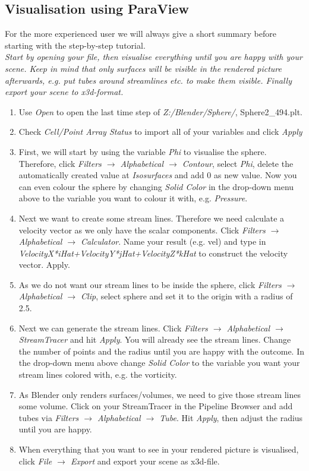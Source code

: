 \documentclass[11pt,twoside,a4paper]{fdyartcl}
\theoremstyle{myPlain}
\theoremstyle{myDefinition}
\begin{document}
\subsection{Visualisation using ParaView}
For the more experienced user we will always give a short summary before starting with the step-by-step tutorial.\\
\textit{Start by opening your file, then visualise everything until you are happy with your scene. Keep in mind that only surfaces will be visible in the rendered picture afterwards, e.g. put tubes around streamlines etc. to make them visible. Finally export your scene to x3d-format.}
\begin{enumerate}
	\item Use \textit{Open} to open the last time step of \textit{Z:/Blender/Sphere/}, Sphere2\_494.plt.
	\item Check \textit{Cell/Point Array Status} to import all of your variables and click \textit{Apply}
	\item First, we will start by using the variable \textit{Phi} to visualise the sphere. Therefore, click \textit{Filters $\rightarrow$ Alphabetical $\rightarrow$ Contour}, select \textit{Phi}, delete the automatically created value at \textit{Isosurfaces} and add 0 as new value. Now you can even colour the sphere by changing \textit{Solid Color} in the drop-down menu above to the variable you want to colour it with, e.g. \textit{Pressure}. 
	\item Next we want to create some stream lines. Therefore we need calculate a velocity vector as we only have the scalar components. Click \textit{Filters $\rightarrow$ Alphabetical $\rightarrow$ Calculator}. Name your result (e.g. vel) and type in \textit{VelocityX*iHat+VelocityY*jHat+VelocityZ*kHat} to construct the velocity vector. Apply.
	\item As we do not want our stream lines to be inside the sphere, click \textit{Filters $\rightarrow$ Alphabetical $\rightarrow$ Clip}, select sphere and set it to the origin with a radius of 2.5.
	\item Next we can generate the stream lines. Click \textit{Filters $\rightarrow$ Alphabetical $\rightarrow$ StreamTracer} and hit \textit{Apply}. You will already see the stream lines. Change the number of points and the radius until you are happy with the outcome. In the drop-down menu above change \textit{Solid Color} to the variable you want your stream lines colored with, e.g. the vorticity.
	\item As Blender only renders surfaces/volumes, we need to give those stream lines some volume. Click on your StreamTracer in the Pipeline Browser and add tubes via \textit{Filters $\rightarrow$ Alphabetical $\rightarrow$ Tube}. Hit \textit{Apply}, then adjust the radius until you are happy.
	\item When everything that you want to see in your rendered picture is visualised, click \textit{File $\rightarrow$ Export} and export your scene as x3d-file.
\end{enumerate}
	
\end{document}
